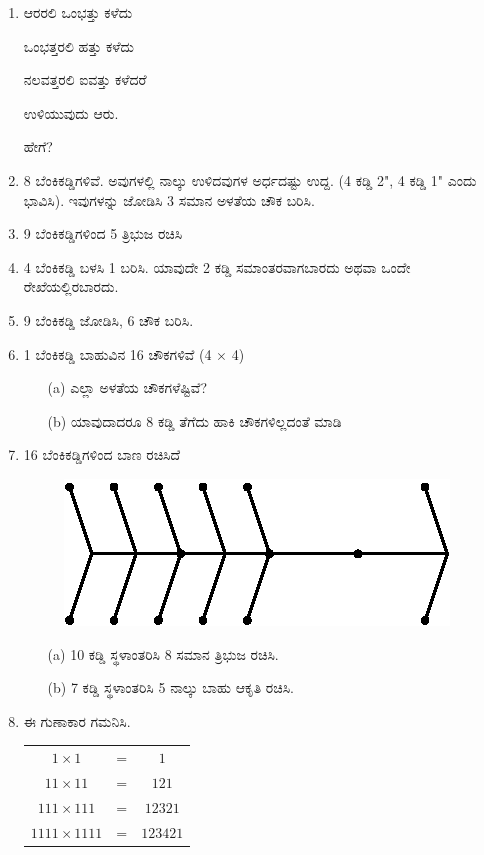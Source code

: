 \begin{enumerate}
\item ಆರರಲಿ ಒಂಭತ್ತು ಕಳೆದು 

ಒಂಭತ್ತರಲಿ ಹತ್ತು ಕಳೆದು 

ನಲವತ್ತರಲಿ ಐವತ್ತು ಕಳೆದರೆ 

ಉಳಿಯುವುದು ಆರು.

ಹೇಗೆ?

\item 8 ಬೆಂಕಿಕಡ್ಡಿಗಳಿವೆ. ಅವುಗಳಲ್ಲಿ ನಾಲ್ಕು ಉಳಿದವುಗಳ ಅರ್ಧದಷ್ಟು ಉದ್ದ. (4 ಕಡ್ಡಿ  2", 4 ಕಡ್ಡಿ 1" ಎಂದು ಭಾವಿಸಿ). ಇವುಗಳನ್ನು ಜೋಡಿಸಿ 3 ಸಮಾನ ಅಳತೆಯ ಚೌಕ ಬರಿಸಿ. 

\item 9 ಬೆಂಕಿಕಡ್ಡಿಗಳಿಂದ 5 ತ್ರಿಭುಜ ರಚಿಸಿ 

\item 4 ಬೆಂಕಿಕಡ್ಡಿ ಬಳಸಿ 1 ಬರಿಸಿ. ಯಾವುದೇ 2 ಕಡ್ಡಿ ಸಮಾಂತರವಾಗಬಾರದು ಅಥವಾ ಒಂದೇ ರೇಖೆಯಲ್ಲಿರಬಾರದು.

\item 9 ಬೆಂಕಿಕಡ್ಡಿ ಜೋಡಿಸಿ, 6 ಚೌಕ ಬರಿಸಿ.

\item 1 ಬೆಂಕಿಕಡ್ಡಿ ಬಾಹುವಿನ 16 ಚೌಕಗಳಿವೆ (4 $\times$ 4)
\begin{itemize}
\item[(a)] ಎಲ್ಲಾ ಅಳತೆಯ ಚೌಕಗಳೆಷ್ಟಿವೆ? 
\item[(b)] ಯಾವುದಾದರೂ 8 ಕಡ್ಡಿ ತೆಗೆದು ಹಾಕಿ ಚೌಕಗಳಿಲ್ಲದಂತೆ ಮಾಡಿ 
\end{itemize}

\item 16 ಬೆಂಕಿಕಡ್ಡಿಗಳಿಂದ ಬಾಣ ರಚಿಸಿದೆ 
\begin{figure}[H]
\centering
\includegraphics{images/chap4/q18.eps}
\end{figure}
\begin{itemize}
\item[(a)] 10 ಕಡ್ಡಿ ಸ್ಥಳಾಂತರಿಸಿ 8 ಸಮಾನ ತ್ರಿಭುಜ ರಚಿಸಿ.
\item[(b)] 7 ಕಡ್ಡಿ ಸ್ಥಳಾಂತರಿಸಿ 5 ನಾಲ್ಕು ಬಾಹು ಆಕೃತಿ ರಚಿಸಿ.
\end{itemize}

\item ಈ ಗುಣಾಕಾರ ಗಮನಿಸಿ.

\begin{tabular}[t]{ccc}
$1 \times 1$ & = & $1$\\
$11 \times 11$ & = & $121$\\
$111 \times 111$ & = & $12321$\\
$1111 \times 1111$ & = & $123421$
\end{tabular}


\end{enumerate}

